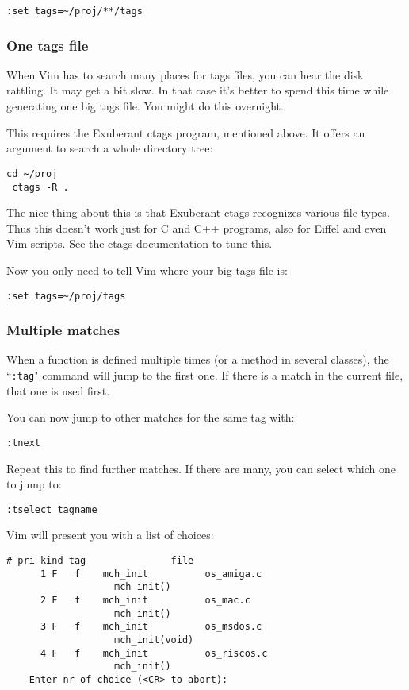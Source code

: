 \begin{Verbatim}[samepage=true]
 :set tags=~/proj/**/tags
\end{Verbatim}
\subsubsection{One tags file}
When Vim has to search many places for tags files, you can hear the disk rattling.
It may get a bit slow.
In that case it's better to spend this time while generating one big tags file.
You might do this overnight.

This requires the Exuberant ctags program, mentioned above.
It offers an argument to search a whole directory tree:

\begin{Verbatim}[samepage=true]
 cd ~/proj
 ctags -R .
\end{Verbatim}

The nice thing about this is that Exuberant ctags recognizes various file types.
Thus this doesn't work just for C and C++ programs, also for Eiffel and even Vim scripts.
See the ctags documentation to tune this.

Now you only need to tell Vim where your big tags file is:

\begin{Verbatim}[samepage=true]
 :set tags=~/proj/tags
\end{Verbatim}
\subsubsection{Multiple matches}
When a function is defined multiple times (or a method in several classes), the ``\texttt{:tag}" command will jump to the first one.
If there is a match in the current file, that one is used first.

You can now jump to other matches for the same tag with:

\begin{Verbatim}[samepage=true]
 :tnext
\end{Verbatim}

Repeat this to find further matches.
If there are many, you can select which one to jump to:

\begin{Verbatim}[samepage=true]
 :tselect tagname
\end{Verbatim}

Vim will present you with a list of choices:

\begin{Verbatim}[samepage=true]
      # pri kind tag               file 
      1 F   f    mch_init          os_amiga.c 
                   mch_init() 
      2 F   f    mch_init          os_mac.c 
                   mch_init() 
      3 F   f    mch_init          os_msdos.c 
                   mch_init(void) 
      4 F   f    mch_init          os_riscos.c 
                   mch_init() 
    Enter nr of choice (<CR> to abort):  
\end{Verbatim}

